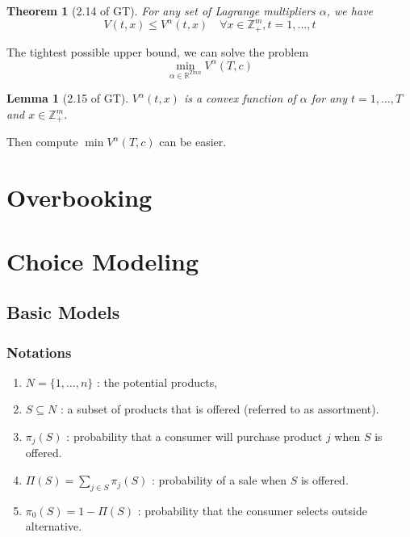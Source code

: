 \documentclass[11pt,a4paper]{article}
\newtheorem{theorem}{Theorem}
\newtheorem{lemma}{Lemma}
\begin{document}
\begin{theorem}[2.14 of GT]
    For any set of Lagrange multipliers $\alpha$, we have
    $$V(t,x)\leq V^{\alpha}(t,x)\quad \forall x\in \mathbb{Z}_+^m,t=1,...,t$$
\end{theorem}

The tightest possible upper bound, we can solve the problem$$\min_{\alpha\in \mathbb{R}^{Tmn}} V^{\alpha}(T,c)$$

\begin{lemma}[2.15 of GT]
    $V^{\alpha}(t,x)$ is a convex function of $\alpha$ for any $t=1,...,T$ and $x\in \mathbb{Z}_+^m$.
\end{lemma}
Then compute $\min V^{\alpha}(T,c)$ can be easier.

\section{Overbooking}

\section{Choice Modeling}
\begin{center}
\end{center}
\subsection{Basic Models}
\subsubsection{Notations}
\begin{enumerate}[$\bullet$]
    \item $N=\{1, \ldots, n\}$ : the potential products,
    \item $S \subseteq N$ : a subset of products that is offered (referred to as assortment).
    \item $\pi_{j}(S)$ : probability that a consumer will purchase product $j$ when $S$ is offered.
    \item $\Pi(S)=\sum_{j \in S} \pi_{j}(S)$ : probability of a sale when $S$ is offered.
    \item $\pi_{0}(S)=1-\Pi(S)$ : probability that the consumer selects outside alternative.
\end{enumerate}
\end{document}
